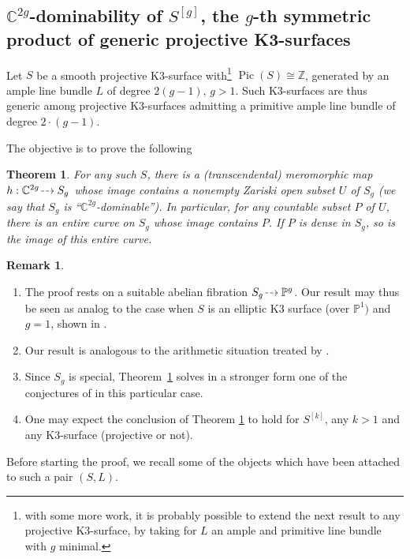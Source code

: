 \documentclass[JEP,XML,SOM,Unicode, NoEqCountersInSection,NoFloatCountersInSection,published]{cedram}
\DeclareMathOperator{\Pic}{Pic}
\newcommand{\dradpl}{{\hspace*{-2.5mm}\begin{tikzcd}[ampersand replacement=\&,column sep = scriptsize]\mbox{}\ar[r,dashed]\&\mbox{}\end{tikzcd}\hspace*{-2.5mm}}}
\newcommand{\dratst}{{\hspace*{-2.5mm}\begin{tikzcd}[ampersand replacement=\&,column sep = small]\mbox{}\ar[r,dashed]\&\mbox{}\end{tikzcd}\hspace*{-2mm}}}
\let\drascst\dratst
\newcommand{\dra}{\mathchoice{\dradpl}{\dratst}{\drascst}{\drascst}}
\let\dasharrow\dra
\theoremstyle{theorem}
\newtheorem{theorem}{Theorem}
\theoremstyle{definition}
\newtheorem{remark}[proposition]{Remark}
\def\bC{{\mathbb C}}
\def\bP{{\mathbb P}}
\def\bZ{{\mathbb Z}}
\begin{document}
\subsection{$\bC^{2g}$-dominability of $S^{[g]}$, the $g$-th symmetric product of generic projective K3-surfaces}

Let $S$ be a smooth projective K3-surface with\footnote{with some more work, it is probably possible to extend the next result to any projective K3-surface, by taking for $L$ an ample and primitive line bundle with $g$ minimal.} $\Pic(S)\cong \bZ$, generated by an ample line bundle $L$ of degree $2(g-1)$, $g>1$. Such K3-surfaces are thus generic among projective K3-surfaces admitting a primitive ample line bundle of degree \hbox{$2\cdot(g-1)$}.

The objective is to prove the following

\begin{theorem}\label{C^2-dom K3} For any such $S$, there is a (transcendental) meromorphic map \hbox{$h:\bC^{2g}\dasharrow S_{g}$} whose image contains a nonempty Zariski open subset $U$ of $S_g$ (we say that $S_{g}$ is ``$\bC^{2g}$-dominable''). In particular, for any countable subset $P$ of $U$, there is an entire curve on $S_{g}$ whose image contains $P$. If $P$ is dense in $S_{g}$, so is the image of this entire curve.
\end{theorem}

\skpt
\begin{remark}
\begin{enumerate}
\item
The proof rests on a suitable abelian fibration $S_{g}\dasharrow \bP^g$. Our result may thus be seen as analog to the case when $S$ is an elliptic K3 surface (over $\bP^1)$ and $g=1$, shown in \cite{BL00}.

\item
Our result is analogous to the arithmetic situation treated by \cite{HT}.

\item
Since $S_{g}$ is special, Theorem~\ref{C^2-dom K3} solves in a stronger form one of the conjectures of \cite{Cam04} in this particular case.

\item
One may expect the conclusion of Theorem \ref{C^2-dom K3} to hold for $S^{[k]}$, any $k>1$ and any K3-surface (projective or not).
\end{enumerate}
\end{remark}

Before starting the proof, we recall some of the objects which have been attached to such a pair $(S,L)$.
\end{document}
